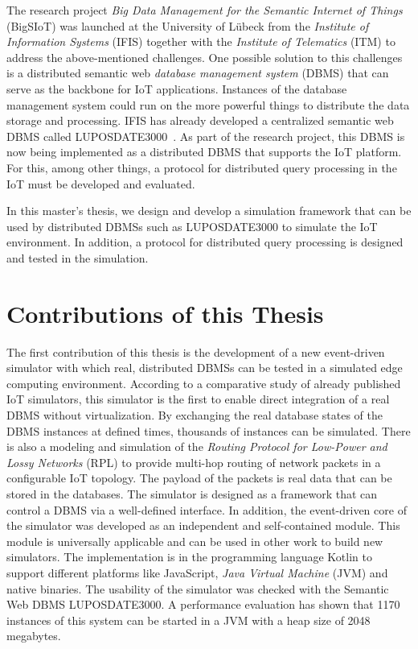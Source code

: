 \documentclass[english,version-2019-11]{uzl-thesis}
\begin{document}
The research project \emph{Big Data Management for the Semantic Internet of Things} (BigSIoT) was launched at the University of L{\"u}beck from the 
\emph{Institute of Information Systems} (IFIS) together with the \emph{Institute of Telematics} (ITM) to address the above-mentioned challenges.
One possible solution to this challenges
is a distributed semantic web \emph{database management system} (DBMS) that can serve as the backbone for IoT applications. Instances of the database management system could run on the more powerful things to distribute the data storage and processing.
IFIS has already developed a centralized semantic web DBMS called LUPOSDATE3000~\cite{Warnke21Flexible}. As part of the research project, this DBMS is now being implemented as a distributed DBMS that supports the IoT platform.
For this, among other things, a protocol for distributed query processing in the IoT must be developed and evaluated.

In this master's thesis, we design and develop a simulation framework that can be used by distributed DBMSs such as LUPOSDATE3000 to simulate the IoT environment.
In addition, a protocol for distributed query processing is designed and tested in the simulation.

\section{Contributions of this Thesis}
The first contribution of this thesis is the development of a new event-driven simulator with which real, distributed DBMSs can be tested in a simulated edge computing environment. According to a comparative study of already published IoT simulators, this simulator is the first to enable direct integration of a real DBMS without virtualization. By exchanging the real database states of the DBMS instances at defined times, thousands of instances can be simulated. There is also a modeling and simulation of the \emph{Routing Protocol for Low-Power and Lossy Networks} (RPL) to provide multi-hop routing of network packets in a configurable IoT topology. The payload of the packets is real data that can be stored in the databases. The simulator is designed as a framework that can control a DBMS via a well-defined interface. In addition, the event-driven core of the simulator was developed as an independent and self-contained module. This module is universally applicable and can be used in other work to build new simulators. The implementation is in the programming language Kotlin to support different platforms like JavaScript, \emph{Java Virtual Machine} (JVM) and native binaries. The usability of the simulator was checked with the Semantic Web DBMS LUPOSDATE3000. A performance evaluation has shown that 1170 instances of this system can be started in a JVM with a heap size of 2048 megabytes.
\end{document}
